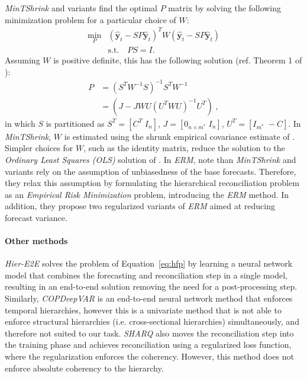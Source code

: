 \documentclass[preprint, 3p, times, twocolumn]{elsarticle}
\begin{document}
\textit{MinTShrink} \cite{wickramasuriya_optimal_2019} and variants find the optimal \(P\) matrix by solving the following minimization problem for a particular choice of \(W\):
\begin{align}
  \min_P &(\hat{\textbf{y}}_{t} - SP\hat{\textbf{y}}_{t})^T W (\hat{\textbf{y}}_{t} - SP\hat{\textbf{y}}_{t}) \nonumber \\
  & \text{s.t.} \quad PS=I. \label{eq:minp}
\end{align}
Assuming \(W\) is positive definite, this has the following solution (ref. Theorem 1 of \cite{wickramasuriya_optimal_2019}):
\begin{align} 
  P &= (S^TW^{-1}S)^{-1}S^TW^{-1} \nonumber \\
    &= (J - JWU(U^TWU)^{-1}U^T) \;, \label{eq:p1}
\end{align}
in which \(S\) is partitioned as \(S^T = [C^T \; I_n]\), \(J = [0_{n \times m^*} \; I_n]\), \(U^T = [I_{m^*} \; -C]\). In \textit{MinTShrink}, \(W\) is estimated using the shrunk empirical covariance estimate of \cite{schafer_shrinkage_2005}. Simpler choices for \(W\), such as the identity matrix, reduce the solution to the \textit{Ordinary Least Squares (OLS)} solution of \cite{hyndman_optimal_2011}. In \textit{ERM}, \citet{bentaieb_regularized_2019} note than \textit{MinTShrink} and variants rely on the assumption of unbiasedness of the base forecasts. Therefore, they relax this assumption by formulating the hierarchical reconciliation problem as an \textit{Empirical Risk Minimization} problem, introducing the \textit{ERM} method. In addition, they propose two regularized variants of \textit{ERM} aimed at reducing forecast variance.

\paragraph{Other methods} \textit{Hier-E2E} \cite{rangapuram_endtoend_2021} solves the problem of Equation~\eqref{eq:hfp} by learning a neural network model that combines the forecasting and reconciliation step in a single model, resulting in an end-to-end solution removing the need for a post-processing step. Similarly, \textit{COPDeepVAR} \cite{rangapuram_coherent_2023} is an end-to-end neural network method that enforces temporal hierarchies, however this is a univariate method that is not able to enforce structural hierarchies (i.e. cross-sectional hierarchies) simultaneously, and therefore not suited to our task. \textit{SHARQ} \cite{han_simultaneously_2021} also moves the reconciliation step into the training phase and achieves reconciliation using a regularized loss function, where the regularization enforces the coherency. However, this method does not enforce absolute coherency to the hierarchy.
\end{document}
